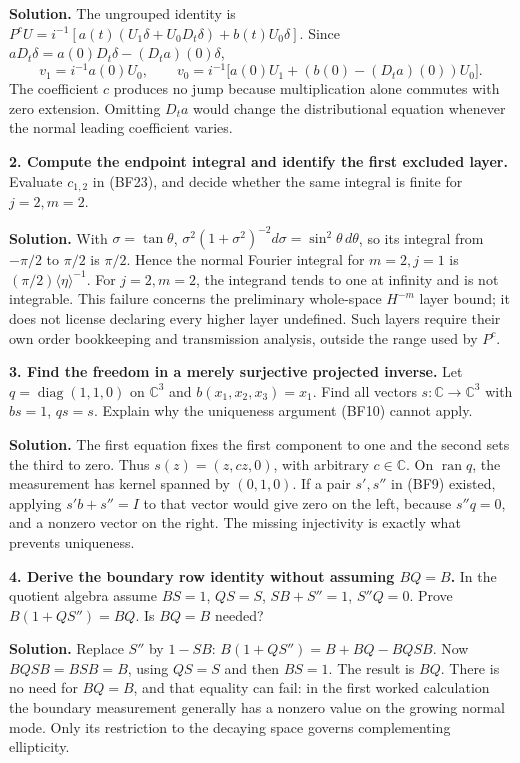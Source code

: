 \documentclass[
  11pt,
]{article}
\begin{document}
\textbf{Solution.} The ungrouped identity is
\(P^cU=i^{-1}[a(t)(U_1\delta+U_0D_t\delta)+b(t)U_0\delta]\). Since
\(aD_t\delta=a(0)D_t\delta-(D_ta)(0)\delta\), \[
 v_1=i^{-1}a(0)U_0,\qquad
 v_0=i^{-1}\big[a(0)U_1+(b(0)-(D_ta)(0))U_0\big].
 \tag{BF45}
\] The coefficient \(c\) produces no jump because multiplication alone
commutes with zero extension. Omitting \(D_ta\) would change the
distributional equation whenever the normal leading coefficient varies.

\textbf{2. Compute the endpoint integral and identify the first excluded
layer.} Evaluate \(c_{1,2}\) in (BF23), and decide whether the same
integral is finite for \(j=2,m=2\).

\textbf{Solution.} With \(\sigma=\tan\theta\),
\(\sigma^2(1+\sigma^2)^{-2}d\sigma=\sin^2\theta\,d\theta\), so its
integral from \(-\pi/2\) to \(\pi/2\) is \(\pi/2\). Hence the normal
Fourier integral for \(m=2,j=1\) is \((\pi/2)\langle\eta\rangle^{-1}\).
For \(j=2,m=2\), the integrand tends to one at infinity and is not
integrable. This failure concerns the preliminary whole-space \(H^{-m}\)
layer bound; it does not license declaring every higher layer undefined.
Such layers require their own order bookkeeping and transmission
analysis, outside the range used by \(P^c\).

\textbf{3. Find the freedom in a merely surjective projected inverse.}
Let \(q=\operatorname{diag}(1,1,0)\) on \(\mathbb C^3\) and
\(b(x_1,x_2,x_3)=x_1\). Find all vectors \(s:\mathbb C\to\mathbb C^3\)
with \(bs=1\), \(qs=s\). Explain why the uniqueness argument (BF10)
cannot apply.

\textbf{Solution.} The first equation fixes the first component to one
and the second sets the third to zero. Thus \(s(z)=(z,cz,0)\), with
arbitrary \(c\in\mathbb C\). On \(\operatorname{ran}q\), the measurement
has kernel spanned by \((0,1,0)\). If a pair \(s',s''\) in (BF9)
existed, applying \(s'b+s''=I\) to that vector would give zero on the
left, because \(s''q=0\), and a nonzero vector on the right. The missing
injectivity is exactly what prevents uniqueness.

\textbf{4. Derive the boundary row identity without assuming \(BQ=B\).}
In the quotient algebra assume \(BS=1\), \(QS=S\), \(SB+S''=1\),
\(S''Q=0\). Prove \(B(1+QS'')=BQ\). Is \(BQ=B\) needed?

\textbf{Solution.} Replace \(S''\) by \(1-SB\): \(B(1+QS'')=B+BQ-BQSB\).
Now \(BQSB=BSB=B\), using \(QS=S\) and then \(BS=1\). The result is
\(BQ\). There is no need for \(BQ=B\), and that equality can fail: in
the first worked calculation the boundary measurement generally has a
nonzero value on the growing normal mode. Only its restriction to the
decaying space governs complementing ellipticity.
\end{document}
